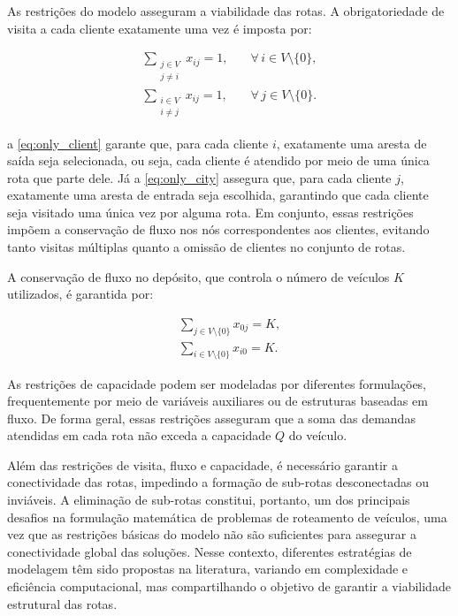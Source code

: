 As restrições do modelo asseguram a viabilidade das rotas. A obrigatoriedade de visita a cada cliente exatamente uma vez é imposta por:

\begin{eqnarray}
\sum_{\substack{j \in V \\ j \neq i}} x_{ij} = 1, & \quad \forall\, i \in V \setminus \{0\}, \label{eq:only_client}\\[4pt]
\sum_{\substack{i \in V \\ i \neq j}} x_{ij} = 1, & \quad \forall\, j \in V \setminus \{0\}. \label{eq:only_city}
\end{eqnarray}

\noindent a \autoref{eq:only_client} garante que, para cada cliente \(i\), exatamente uma aresta de saída seja selecionada, ou seja, cada cliente é atendido por meio de uma única rota que parte dele. Já a \autoref{eq:only_city} assegura que, para cada cliente \(j\), exatamente uma aresta de entrada seja escolhida, garantindo que cada cliente seja visitado uma única vez por alguma rota. Em conjunto, essas restrições impõem a conservação de fluxo nos nós correspondentes aos clientes, evitando tanto visitas múltiplas quanto a omissão de clientes no conjunto de rotas. 

A conservação de fluxo no depósito, que controla o número de veículos $K$ utilizados, é garantida por:

\begin{eqnarray}
\sum_{j \in V \setminus \{0\}} x_{0j} = K, \\[4pt]
\sum_{i \in V \setminus \{0\}} x_{i0} = K.
\end{eqnarray}

As restrições de capacidade podem ser modeladas por diferentes formulações, frequentemente por meio de variáveis auxiliares ou de estruturas baseadas em fluxo. De forma geral, essas restrições asseguram que a soma das demandas atendidas em cada rota não exceda a capacidade $Q$ do veículo.

Além das restrições de visita, fluxo e capacidade, é necessário garantir a conectividade das rotas, impedindo a formação de sub-rotas desconectadas ou inviáveis. A eliminação de sub-rotas constitui, portanto, um dos principais desafios na formulação matemática de problemas de roteamento de veículos, uma vez que as restrições básicas do modelo não são suficientes para assegurar a conectividade global das soluções. Nesse contexto, diferentes estratégias de modelagem têm sido propostas na literatura, variando em complexidade e eficiência computacional, mas compartilhando o objetivo de garantir a viabilidade estrutural das rotas.

